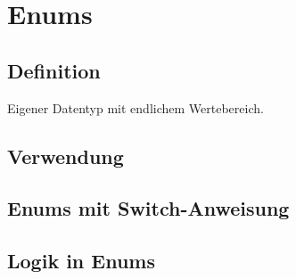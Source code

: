 \section*{Enums}
	\begin{minipage}[t]{10cm}
		\subsection*{Definition}
		Eigener Datentyp mit endlichem Wertebereich.
		
	\end{minipage}	
	\hspace*{0.5cm}
	\begin{minipage}[t]{8.3cm}
		\subsection*{Verwendung}
		
	\end{minipage}
	\vspace*{0.1cm}
	\newline
	\begin{minipage}[t]{7.1cm}
		\subsection*{Enums mit Switch-Anweisung}
		
	\end{minipage}
	\hspace*{0.5cm}
	\begin{minipage}[t]{11.2cm}
		\subsection*{Logik in Enums}
		
\end{minipage}